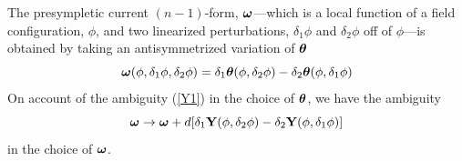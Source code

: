 The presympletic current $(n-1)$-form, ${\mbox{\boldmath
$\omega$}}$---which is a local function of a field configuration,
$\phi$, and two linearized perturbations, $\delta_1 \phi$ and
$\delta_2 \phi$ off of $\phi$---is obtained by taking an
antisymmetrized variation of ${\mbox{\boldmath $\theta$}}$
\begin{equation}
{\mbox{\boldmath $\omega$}} (\phi, \delta_1 \phi, \delta_2 \phi) =
\delta_1 {\mbox{\boldmath $\theta$}} (\phi,\delta_2
\phi)-\delta_2{\mbox{\boldmath $\theta$}} (\phi,\delta_1 \phi)
\label{omega}
\end{equation}
On account of the ambiguity (\ref{Y1}) in the choice of 
${\mbox{\boldmath $\theta$}}$, we have the ambiguity
\begin{equation}
{\mbox{\boldmath $\omega$}} \rightarrow {\mbox{\boldmath $\omega$}} +
d [\delta_1 {\bf Y}(\phi, \delta_2 \phi) - \delta_2 {\bf Y}(\phi,
\delta_1 \phi)]
\label{Y2}
\end{equation}
in the choice of ${\mbox{\boldmath $\omega$}}$. 

